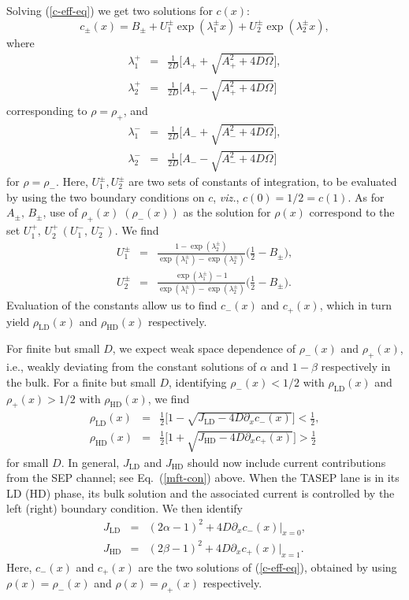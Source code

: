 \documentclass[aps,pre,twocolumn,superscriptaddress,amsmath,amssymb,longbibliography,floatfix]{revtex4}
\begin{document}
{Solving (\ref{c-eff-eq}) we get two solutions for $c(x)$:
\begin{equation}
 c_\pm(x)=B_\pm + U^\pm_1\exp(\lambda^\pm_1 x)+U^\pm_2\exp(\lambda^\pm_2 x),\label{ceq-soln}
\end{equation}
where
\begin{eqnarray}
 \lambda_1^+&=&\frac{1}{2D}\bigg[A_++\sqrt{A_+^2+4D\Omega}\bigg],\\
 \lambda_2^+&=&\frac{1}{2D}\bigg[A_+-\sqrt{A_+^2+4D\Omega}\bigg]
\end{eqnarray}
corresponding to $\rho=\rho_+$, and
\begin{eqnarray}
 \lambda_1^-&=&\frac{1}{2D}\bigg[A_-+\sqrt{A_-^2+4D\Omega}\bigg],\\
 \lambda_2^-&=&\frac{1}{2D}\bigg[A_--\sqrt{A_-^2+4D\Omega}\bigg]
\end{eqnarray}
for $\rho=\rho_-$.
Here, $U^\pm_1,U^\pm_2$ are two sets of constants of integration, to be evaluated by using the two boundary conditions on $c$, {\em viz.}, $c(0)=1/2=c(1)$. As for $A_\pm,\,B_\pm$, use of $\rho_+(x)\; (\rho_-(x))$ as the solution for $\rho(x)$ correspond to the set $U^+_1,\,U^+_2\,(U^-_1,\,U^-_2)$. We find
\begin{eqnarray}
 U_1^\pm&=& \frac{1-\exp(\lambda_2^\pm)}{\exp(\lambda_1^\pm)-\exp(\lambda_2^\pm)}\bigg(\frac{1}{2}-B_\pm\bigg),\\
 U_2^\pm&=& \frac{\exp(\lambda_1^\pm)-1}{\exp(\lambda_1^\pm)-\exp(\lambda_2^\pm)}\bigg(\frac{1}{2}-B_\pm\bigg).
\end{eqnarray}
Evaluation of the constants allow us to find $c_-(x)$ and $c_+(x)$, which in turn yield $\rho_\text{LD}(x)$ and $\rho_\text{HD}(x)$ respectively.  


For finite but small $D$, we expect weak space dependence of $\rho_-(x)$ and $\rho_+(x)$, i.e., weakly deviating from the constant solutions of $\alpha$ and $1-\beta$ respectively in the bulk. For a finite but small $D$, identifying $\rho_-(x)<1/2$ with $\rho_\text{LD}(x)$ and $\rho_+(x)>1/2$ with $\rho_\text{HD}(x)$, we find 
\begin{eqnarray}
 \rho_\text{LD}(x)&=&\frac{1}{2}\bigg[1-\sqrt{J_\text{LD}-4D\partial_x c_-(x)}\bigg]<\frac{1}{2},\label{rho-ld-smallD}\\
 \rho_\text{HD}(x)&=&\frac{1}{2}\bigg[1+\sqrt{J_\text{HD}-4D\partial_x c_+(x)}\bigg]>\frac{1}{2} \label{rho-hd-smallD}
\end{eqnarray}
for small $D$.
In general, $J_\text{LD}$ and $J_\text{HD}$ should now include current contributions from the SEP channel; see Eq.~(\ref{mft-con}) above. When the TASEP lane is in its LD (HD) phase, its bulk solution and the associated current is controlled by the left (right) boundary condition. We then identify 
\begin{eqnarray}
 J_\text{LD}&=& (2\alpha-1)^2+ 4D\partial_x c_-(x)|_{x=0},\\
 J_\text{HD}&=&(2\beta-1)^2 + 4D\partial_x c_+(x)|_{x=1}.
\end{eqnarray}
Here, $c_-(x)$ and $c_+(x)$ are the two solutions of  (\ref{c-eff-eq}), obtained by using $\rho(x)=\rho_-(x)$ and $\rho(x)=\rho_+(x)$ respectively.


}
\end{document}
